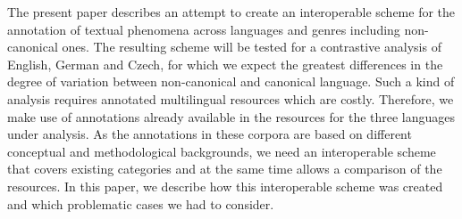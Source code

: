 The present paper describes an attempt to create an interoperable scheme for the annotation of textual phenomena across languages and genres including non-canonical ones. The resulting scheme will be tested for a contrastive analysis of English, German and Czech, for which we expect the greatest differences in the degree of variation between non-canonical and canonical language. Such a kind of analysis requires annotated multilingual resources which are costly. Therefore, we make use of annotations already available in the resources for the three languages under analysis. As the annotations in these corpora are based on different conceptual and methodological backgrounds, we need an interoperable scheme that covers existing categories and at the same time allows a comparison of the resources. In this paper, we describe how this interoperable scheme was created and which problematic cases we had to consider.
